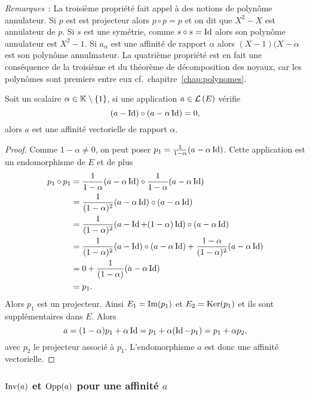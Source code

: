 \emph{Remarques}~: La troisième propriété fait appel à des notions de polynôme annulateur. Si \(p\) est est projecteur alors \(p \circ p=p\) et on dit que \(X^2-X\) est annulateur de \(p\). Si \(s\) est une symétrie, comme \(s \circ s =\operatorname{Id}\) alors son polynôme annulateur est \(X^2-1\). Si \(a_\alpha\) est une affinité de rapport \(\alpha\) alors \((X-1)(X-\alpha\) est son polynôme annulmateur. La quatrième propriété est en fait une conséquence de la troisième et du théorème de décomposition des noyaux, car les polynômes sont premiers entre eux cf.\ chapitre~\ref{chap:polynomes}.

\begin{prop}
  Soit un scalaire \(\alpha \in \mathbb{K}\setminus\{1\}\), si une application \(a \in \mathcal{L}\left(E\right)\) vérifie
  \begin{equation}
    (a-\operatorname{Id})\circ (a-\alpha \operatorname{Id})=0,
  \end{equation}
  alors \(a\) est une affinité vectorielle de rapport \(\alpha\).
\end{prop}
\begin{proof}
  Comme \(1-\alpha\neq 0\), on peut poser \(p_1=\frac{1}{1-\alpha} (a-\alpha\operatorname{Id})\). Cette application est un endomorphisme de \(E\) et de plus
  \begin{align}
    p_1 \circ p_1 &= \frac{1}{1-\alpha} (a-\alpha\operatorname{Id}) \circ \frac{1}{1-\alpha} (a-\alpha\operatorname{Id}) \\
    &=\frac{1}{(1-\alpha)^2} (a-\alpha\operatorname{Id}) \circ (a-\alpha\operatorname{Id}) \\
    &=\frac{1}{(1-\alpha)^2} (a-\operatorname{Id} +(1-\alpha)\operatorname{Id}) \circ (a-\alpha\operatorname{Id}) \\
    &=\frac{1}{(1-\alpha)^2} (a-\operatorname{Id}) \circ (a-\alpha\operatorname{Id}) + \frac{1-\alpha}{(1-\alpha)^2}(a-\alpha\operatorname{Id}) \\
    &= 0 + \frac{1}{(1-\alpha)}(a-\alpha\operatorname{Id})\\
    &=p_1.
  \end{align}
  Alors \(p_1\) est un projecteur. Ainsi \(E_1=\operatorname{Im}(p_1)\) et \(E_2=\operatorname{Ker}(p_1)\) et ils sont supplémentaires dans \(E\). Alors
  \begin{equation}
    a=(1-\alpha)p_1 +\alpha \operatorname{Id} = p_1 +\alpha(\operatorname{Id}-p_1) = p_1+\alpha p_2,
  \end{equation}
  avec \(p_2\) le projecteur associé à \(p_1\). L'endomorphisme \(a\) est donc une affinité vectorielle.
\end{proof}

\subsubsection{\(\operatorname{Inv}(a)\) et \(\operatorname{Opp}(a)\) pour une affinité \(a\)}

